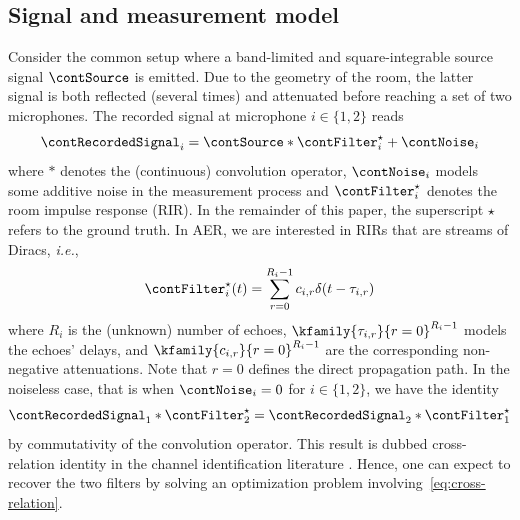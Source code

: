 \subsection{Signal and measurement model}
Consider the common setup where a band-limited and square-integrable source signal $\contSource$ is emitted.
Due to the geometry of the room, the latter signal is both reflected (several times) and attenuated before reaching a set of two microphones.
The recorded signal at microphone $i\in\{1,2\}$ reads
\begin{equation}
    \label{eq:recordedSignal}
    \contRecordedSignal_i = \contSource \ast \contFilter_i^\star + \contNoise_i
\end{equation}
where $\ast$ denotes the (continuous) convolution operator, $\contNoise_i$ models some additive noise in the measurement process and $\contFilter_i^\star$ denotes the room impulse response (RIR).
In the remainder of this paper, the  superscript $\star$ refers to the ground truth.
In AER, we are interested in RIRs that are streams of Diracs, \textit{i.e.},
\begin{equation}
    \label{eq:def_filter_star}
    \contFilter_i^\star(t) = \sum_{r=0}^{R_i-1} c_{i,r} \delta(t - \tau_{i,r})
\end{equation}
where $R_i$ is the (unknown) number of echoes, $\kfamily{\tau_{i,r}}{r=0}^{R_i-1}$ models the echoes' delays, and $\kfamily{c_{i,r}}{r=0}^{R_i-1}$ are the corresponding non-negative attenuations.
Note that $r=0$ defines the direct propagation path.
%
In the noiseless case, that is when $\contNoise_i=0$ for $i\in\{1,2\}$, we have the identity
\begin{equation} \label{eq:cross-relation}
    \contRecordedSignal_1 \ast \contFilter_2^\star = \contRecordedSignal_2 \ast \contFilter_1^\star
\end{equation}
by commutativity of the convolution operator.
This result is dubbed cross-relation identity in the channel identification literature \cite{Xu1995}.
Hence, one can expect to recover the two filters by solving an optimization problem involving~\eqref{eq:cross-relation}.

